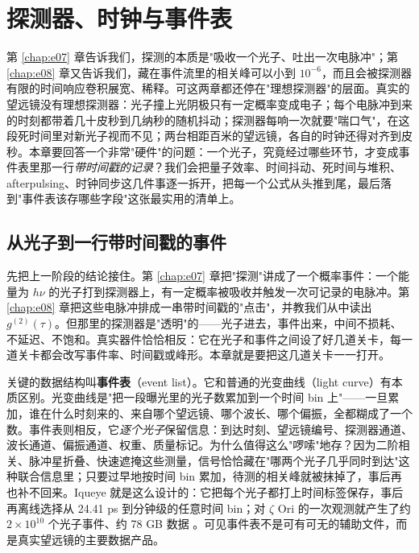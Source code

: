 \chapter{探测器、时钟与事件表}
\label{chap:e13}

\begin{chapteropening}
第 \ref{chap:e07} 章告诉我们，探测的本质是"吸收一个光子、吐出一次电脉冲"；第 \ref{chap:e08} 章又告诉我们，藏在事件流里的相关峰可以小到 \(10^{-6}\)，而且会被探测器有限的时间响应卷积展宽、稀释。可这两章都还停在"理想探测器"的层面。真实的望远镜没有理想探测器：光子撞上光阴极只有一定概率变成电子；每个电脉冲到来的时刻都带着几十皮秒到几纳秒的随机抖动；探测器每响一次就要"喘口气"，在这段死时间里对新光子视而不见；两台相距百米的望远镜，各自的时钟还得对齐到皮秒。本章要回答一个非常"硬件"的问题：一个光子，究竟经过哪些环节，才变成事件表里那一行\emph{带时间戳的记录}？我们会把量子效率、时间抖动、死时间与堆积、afterpulsing、时钟同步这几件事逐一拆开，把每一个公式从头推到尾，最后落到"事件表该存哪些字段"这张最实用的清单上。
\end{chapteropening}

\section{从光子到一行带时间戳的事件}
\label{sec:e13-from-photon-to-event}

先把上一阶段的结论接住。第 \ref{chap:e07} 章把"探测"讲成了一个概率事件：一个能量为 \(h\nu\) 的光子打到探测器上，有一定概率被吸收并触发一次可记录的电脉冲。第 \ref{chap:e08} 章把这些电脉冲排成一串带时间戳的"点击"，并教我们从中读出 \(g^{(2)}(\tau)\)。但那里的探测器是"透明"的——光子进去，事件出来，中间不损耗、不延迟、不饱和。真实器件恰恰相反：它在光子和事件之间设了好几道关卡，每一道关卡都会改写事件率、时间戳或峰形。本章就是要把这几道关卡一一打开。

关键的数据结构叫\textbf{事件表}（event list）。它和普通的光变曲线（light curve）有本质区别。光变曲线是"把一段曝光里的光子数累加到一个时间 bin 上"——一旦累加，谁在什么时刻来的、来自哪个望远镜、哪个波长、哪个偏振，全都糊成了一个数。事件表则相反，它\emph{逐个光子}保留信息：到达时刻、望远镜编号、探测器通道、波长通道、偏振通道、权重、质量标记。为什么值得这么"啰嗦"地存？因为二阶相关、脉冲星折叠、快速遮掩这些测量，信号恰恰藏在"哪两个光子几乎同时到达"这种联合信息里；只要过早地按时间 bin 累加，待测的相关峰就被抹掉了，事后再也补不回来。Iqueye 就是这么设计的：它把每个光子都打上时间标签保存，事后再离线选择从 24.41 ps 到分钟级的任意时间 bin；对 \(\zeta\) Ori 的一次观测就产生了约 \(2\times10^{10}\) 个光子事件、约 78 GB 数据 \citep{2009A&A...508..531N,2019CoSka..49...85Z}。可见事件表不是可有可无的辅助文件，而是真实望远镜的主要数据产品。

